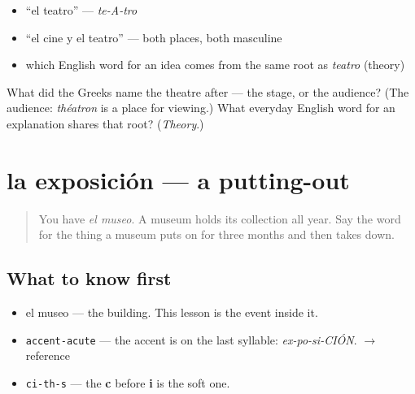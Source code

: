 \begin{itemize}
\raggedright
  \item \textquotedblleft{}el teatro\textquotedblright{} — \emph{te-A-tro}
  \item \textquotedblleft{}el cine y el teatro\textquotedblright{} — both places, both masculine
  \item which English word for an idea comes from the same root as \emph{teatro} (theory)
\end{itemize}

\begin{tcolorbox}[breakable,colback=teal!4,colframe=teal!35!black,title={Before you move on}]
What did the Greeks name the theatre after — the stage, or the audience? (The audience: \emph{théatron} is a place for viewing.) What everyday English word for an explanation shares that root? (\emph{Theory}.)
\end{tcolorbox}
\section[la exposición]{la exposición — a putting-out}

\label{lesson:ES-C420-exposicion}



\begin{quote}
You have \emph{el museo}. A museum holds its collection all year. Say the word for the thing a museum puts on for three months and then takes down.
\end{quote}

\subsection*{What to know first}
\begin{itemize}
\raggedright
  \item el museo — the building. This lesson is the event inside it.
\end{itemize}

\begin{sounds}
\begin{itemize}
\raggedright
  \item \texttt{accent-acute} — the accent is on the last syllable: \emph{ex-po-si-CIÓN}. $\to$ reference
  \item \texttt{ci-th-s} — the \textbf{c} before \textbf{i} is the soft one.
\end{itemize}
\end{sounds}

